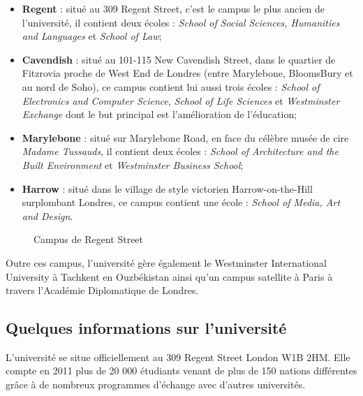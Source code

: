 \begin{itemize}
	\item \textbf{Regent} : situ\'e au 309 Regent Street, c'est le campus le plus ancien de l'universit\'e, il contient deux \'ecoles : 
		\textit{School of Social Sciences, Humanities and Languages} et \textit{School of Law};

	\item \textbf{Cavendish} : situ\'e au 101-115 New Cavendish Street, dans le quartier de Fitzrovia proche de West End de Londres (entre Marylebone, BloomsBury et au nord de Soho), ce campus contient lui aussi trois \'ecoles : 
		\textit{School of Electronics and Computer Science}, \textit{School of Life Sciences} et \textit{Westminster Exchange} dont le but principal est l'am\'elioration de l'\'education;


	\item \textbf{Marylebone} : situ\'e sur Marylebone Road, en face du c\'el\`ebre mus\'ee de cire \textit{Madame Tussauds}, il contient deux \'ecoles :
		\textit{School of Architecture and the Built Environment} et \textit{Westminster Business School};

	\item \textbf{Harrow} : situ\'e dans le village de style victorien Harrow-on-the-Hill surplombant Londres, ce campus contient une \'ecole : 
		\textit{School of Media, Art and Design}.

\end{itemize}

\begin{figure}[!ht]
	\centering
	\qquad
	\caption{Campus de Regent Street}

\end{figure}

Outre ces campus, l'universit\'e g\`ere \'egalement le Westminster International University \`a Tachkent en Ouzb\'ekistan ainsi qu'un campus satellite \`a Paris \`a travers l'Acad\'emie Diplomatique de Londres.

\subsection{Quelques informations sur l'universit\'e}

L'universit\'e se situe officiellement au 309 Regent Street London W1B 2HM.
Elle compte en 2011 plus de 20 000 \'etudiants venant de plus de 150 nations diff\'erentes gr\^ace \`a de nombreux programmes d'\'echange avec d'autres universit\'es.

